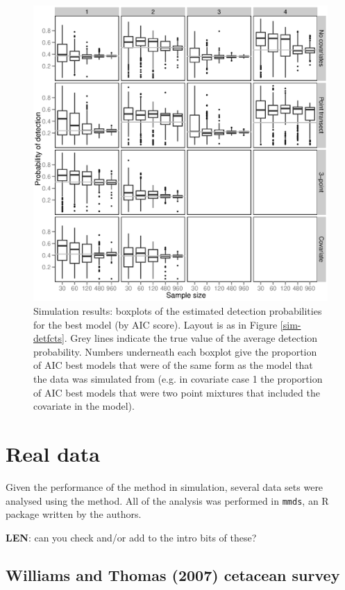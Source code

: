 \documentclass[useAMS,referee, usegraphicx]{biom}
\begin{document}
\begin{figure}
\centering
\includegraphics[width=\textwidth]{simulations/pa-plot.eps}
\caption{Simulation results: boxplots of the estimated detection probabilities for the best model (by AIC score). Layout is as in Figure \ref{sim-detfcts}. Grey lines indicate the true value of the average detection probability. Numbers underneath each boxplot give the proportion of AIC best models that were of the same form as the model that the data was simulated from (e.g. in covariate case 1 the proportion of AIC best models that were two point mixtures that included the covariate in the model).}
\label{sim-boxplots}
\end{figure}


\section{Real data}
\label{s:data}

Given the performance of the method in simulation, several data sets were analysed using the method. All of the analysis was performed in \texttt{mmds}, an \textsf{R} package written by the authors.

\textbf{LEN}: can you check and/or add to the intro bits of these?

\subsection{Williams and Thomas (2007) cetacean survey}
\end{document}
